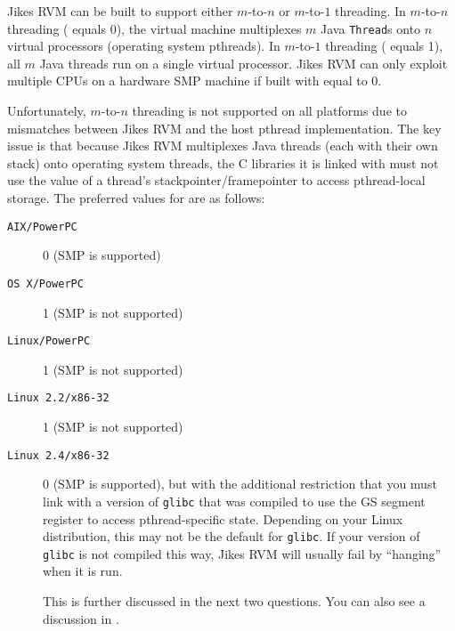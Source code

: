 Jikes RVM can be built to support either $m$-to-$n$ or $m$-to-$1$
threading.  In $m$-to-$n$ threading
( equals 0), the virtual machine
multiplexes $m$ Java {\tt Thread}s
onto $n$ virtual processors (operating system pthreads).
In $m$-to-$1$ threading ( equals 1),
all $m$ Java threads run on a single virtual processor.  Jikes RVM 
can only exploit multiple CPUs on a hardware SMP machine if 
built with  equal to 0.

Unfortunately, $m$-to-$n$ threading is not supported on all platforms due to
mismatches between Jikes RVM  and the host pthread implementation.  
The key issue is that because Jikes RVM multiplexes Java threads
(each with their own stack) onto operating system threads, the
C libraries it is linked with must not use the value of a thread's
stackpointer/framepointer to access pthread-local storage.  The
preferred values for  are as
follows: 

\begin{description}

\item[{\tt AIX/PowerPC}] 0 (SMP is supported)

\item[{\tt OS~X/PowerPC}]  1 (SMP is not supported)

\item[{\tt Linux/PowerPC}]  1 (SMP is not supported)

\item[{\tt Linux 2.2/x86-32}] 1 (SMP is not supported)

\item[{\tt Linux 2.4/x86-32}] 0 (SMP is supported), but with the
additional restriction that you must link with a version of \texttt{glibc} that
was compiled to use the GS segment register to access pthread-specific
state.  Depending on your Linux\Rweb{} distribution, this may not be the
default for \texttt{glibc}.  If your version of \texttt{glibc}
is not compiled this way, Jikes RVM will usually fail by ``hanging'' when
it is run.

This is further discussed in the next two
questions.  You can also see a discussion in . 

\end{description}                

